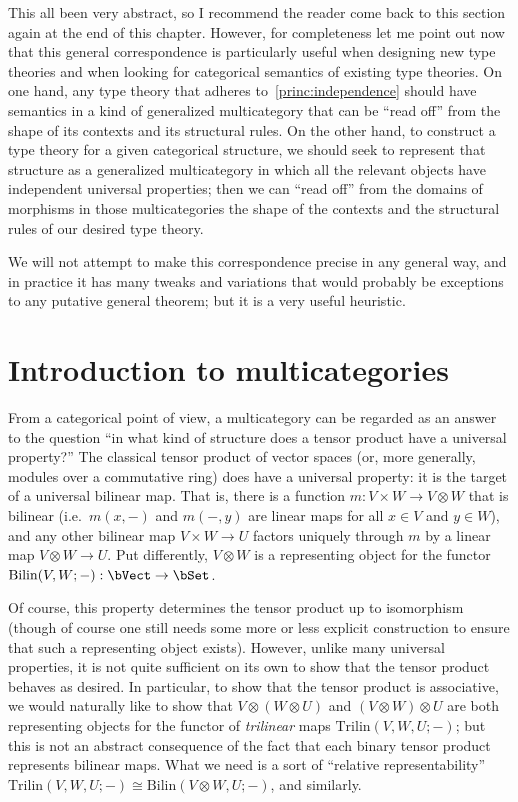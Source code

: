 \documentclass{book}
\let\tensor\otimes
\begin{document}
This all been very abstract, so I recommend the reader come back to this section again at the end of this chapter.
However, for completeness let me point out now that this general correspondence is particularly useful when designing new type theories and when looking for categorical semantics of existing type theories.
On one hand, any type theory that adheres to~\eqref{princ:independence} should have semantics in a kind of generalized multicategory that can be ``read off'' from the shape of its contexts and its structural rules.
On the other hand, to construct a type theory for a given categorical structure, we should seek to represent that structure as a generalized multicategory in which all the relevant objects have independent universal properties; then we can ``read off'' from the domains of morphisms in those multicategories the shape of the contexts and the structural rules of our desired type theory.

We will not attempt to make this correspondence precise in any general way, and in practice it has many tweaks and variations that would probably be exceptions to any putative general theorem; but it is a very useful heuristic.


\section{Introduction to multicategories}
\label{sec:multicats-catth}

From a categorical point of view, a multicategory can be regarded as an answer to the question ``in what kind of structure does a tensor product have a universal property?''
The classical tensor product of vector spaces (or, more generally, modules over a commutative ring) does have a universal property: it is the target of a universal bilinear map.
That is, there is a function $m:V\times W \to V\tensor W$ that is bilinear (i.e.\ $m(x,-)$ and $m(-,y)$ are linear maps for all $x\in V$ and $y\in W$), and any other bilinear map $V\times W \to U$ factors uniquely through $m$ by a linear map $V\tensor W \to U$.
Put differently, $V\tensor W$ is a representing object for the functor $\mathrm{Bilin}(V,W;-) : \bVect \to \bSet$.

Of course, this property determines the tensor product up to isomorphism (though of course one still needs some more or less explicit construction to ensure that such a representing object exists).
However, unlike many universal properties, it is not quite sufficient on its own to show that the tensor product behaves as desired.
In particular, to show that the tensor product is associative, we would naturally like to show that $V\tensor (W\tensor U)$ and $(V\tensor W)\tensor U$ are both representing objects for the functor of \emph{trilinear} maps $\mathrm{Trilin}(V,W,U;-)$; but this is not an abstract consequence of the fact that each binary tensor product represents bilinear maps.
What we need is a sort of ``relative representability'' $\mathrm{Trilin}(V,W,U;-) \cong \mathrm{Bilin}(V\tensor W,U;-)$, and similarly.
\end{document}
